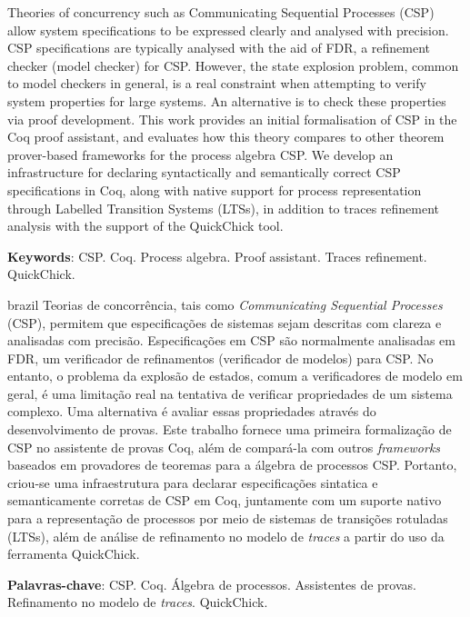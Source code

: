 \documentclass[
	12pt,				%
	a4paper,			%
	oneside,
	english			%
	]{abntex2}
\theoremstyle{definition}
\begin{document}
\setlength{\absparsep}{18pt} %
\begin{resumo}
 Theories of concurrency such as Communicating Sequential Processes (CSP) allow system specifications to be expressed clearly and analysed with precision. CSP specifications are typically analysed with the aid of FDR, a refinement checker (model checker) for CSP. However, the state explosion problem, common to model checkers in general, is a real constraint when attempting to verify system properties for large systems. An alternative is to check these properties via proof development. This work provides an initial formalisation of CSP in the Coq proof assistant, and evaluates how this theory compares to other theorem prover-based frameworks for the process algebra CSP. We develop an infrastructure for declaring syntactically and semantically correct CSP specifications in Coq, along with native support for process representation through Labelled Transition Systems (LTSs), in addition to traces refinement analysis with the support of the QuickChick tool.

 \textbf{Keywords}: CSP. Coq. Process algebra. Proof assistant. Traces refinement. QuickChick.
\end{resumo}

\begin{resumo}[Resumo]
 \begin{otherlanguage*}{brazil}
   Teorias de concorrência, tais como \emph{Communicating Sequential Processes} (CSP), permitem que especificações de sistemas sejam descritas com clareza e analisadas com precisão. Especificações em CSP são normalmente analisadas em FDR, um verificador de refinamentos (verificador de modelos) para CSP. No entanto, o problema da explosão de estados, comum a verificadores de modelo em geral, é uma limitação real na tentativa de verificar propriedades de um sistema complexo. Uma alternativa é avaliar essas propriedades através do desenvolvimento de provas. Este trabalho fornece uma primeira formalização de CSP no assistente de provas Coq, além de compará-la com outros \emph{frameworks} baseados em provadores de teoremas para a álgebra de processos CSP. Portanto, criou-se uma infraestrutura para declarar especificações sintatica e semanticamente corretas de CSP em Coq, juntamente com um suporte nativo para a representação de processos por meio de sistemas de transições rotuladas (LTSs), além de análise de refinamento no modelo de \emph{traces} a partir do uso da ferramenta QuickChick.

   \textbf{Palavras-chave}: CSP. Coq. Álgebra de processos. Assistentes de provas. Refinamento no modelo de \emph{traces}. QuickChick.
 \end{otherlanguage*}
\end{resumo}
\end{document}
